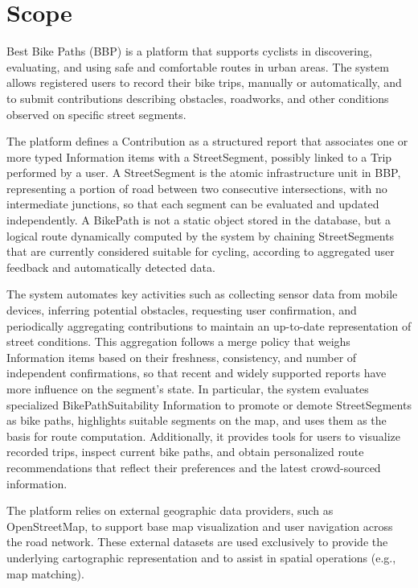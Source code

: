 \section{Scope}
\label{sec:scope}%
Best Bike Paths (BBP) is a platform that supports cyclists in discovering, evaluating, and using safe and comfortable routes in urban areas. The system allows registered users to record their bike trips, manually or automatically, and to submit contributions describing obstacles, roadworks, and other conditions observed on specific street segments.

The platform defines a Contribution as a structured report that associates one or more typed Information items with a StreetSegment, possibly linked to a Trip performed by a user. A StreetSegment is the atomic infrastructure unit in BBP, representing a portion of road between two consecutive intersections, with no intermediate junctions, so that each segment can be evaluated and updated independently. A BikePath is not a static object stored in the database, but a logical route dynamically computed by the system by chaining StreetSegments that are currently considered suitable for cycling, according to aggregated user feedback and automatically detected data.

The system automates key activities such as collecting sensor data from mobile devices, inferring potential obstacles, requesting user confirmation, and periodically aggregating contributions to maintain an up-to-date representation of street conditions. This aggregation follows a merge policy that weighs Information items based on their freshness, consistency, and number of independent confirmations, so that recent and widely supported reports have more influence on the segment’s state. In particular, the system evaluates specialized BikePathSuitability Information to promote or demote StreetSegments as bike paths, highlights suitable segments on the map, and uses them as the basis for route computation. Additionally, it provides tools for users to visualize recorded trips, inspect current bike paths, and obtain personalized route recommendations that reflect their preferences and the latest crowd-sourced information.

The platform relies on external geographic data providers, such as OpenStreetMap, to support
base map visualization and user navigation across the road network. These external datasets
are used exclusively to provide the underlying cartographic representation and to assist in
spatial operations (e.g., map matching).

